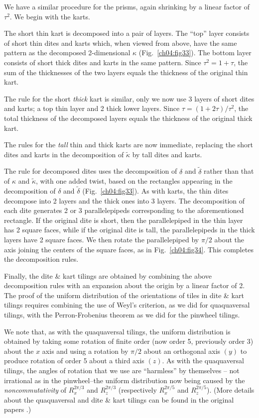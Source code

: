 \documentclass[reqno]{stml-l}
\theoremstyle{plain}
\theoremstyle{definition}
\numberwithin{equation}{chapter}
\begin{document}
We have a similar procedure for the prisms, again shrinking by a linear factor of $\tau^{2}$. We begin with the karts.

The short thin kart is decomposed into a pair of layers. The ``top'' layer consists of short thin dites and karts which, when viewed from above, have the same pattern as the decomposed 2-dimensional $\kappa$ (Fig.~\ref{ch04:fig33}). The bottom layer consists of short thick dites and karts in the same pattern. Since $\tau^{2}=1+\tau$, the sum of the thicknesses of the two layers equals the thickness of the original thin kart.

The rule for the short \emph{thick} kart is similar, only we now use 3 layers of short dites and karts; a top thin layer and 2 thick lower layers. Since $\tau=(1+2\tau)/\tau^{2}$, the total thickness of the decomposed layers equals the thickness of the original thick kart.

The rules for the \emph{tall} thin and thick karts are now immediate, replacing the short dites and karts in the decomposition of $\tilde{\kappa}$ by tall dites and karts.

The rule for decomposed dites uses the decomposition of
$\delta$ and $\tilde{\delta}$ rather than that of $\kappa$
and $\tilde{\kappa}$, with one added twist, based on the
rectangles appearing in the decomposition of $\delta$ and
$\tilde{\delta}$ (Fig.~\ref{ch04:fig33}). As with karts,
the thin dites decompose into 2 layers and the thick ones
into 3 layers. The decomposition of each dite generates 2
or 3 parallelepipeds corresponding to the aforementioned
rectangle. If the original dite is short, then the
parallelepiped in the thin layer has 2 square faces, while
if the original dite is tall, the parallelepipeds in the
thick layers have 2 square faces. We then rotate the
parallelepiped by $\pi/2$ about the axis joining the
centers of the square faces, as in Fig.~\ref{ch04:fig34}.
This completes the decomposition rules.

Finally, the dite \& kart tilings are obtained by combining the above decomposition rules with an expansion about the origin by a linear factor of 2. The proof of the uniform distribution of the orientations of tiles in dite \& kart tilings requires combining the use of Weyl's criterion, as we did for quaquaversal tilings, with the Perron-Frobenius theorem as we did for the pinwheel tilings.

We note that, as with the quaquaversal tilings, the uniform distribution is obtained by taking some rotation of finite order (now order 5, previously order 3) about the $x$ axis and using a rotation by $\pi/2$ about an orthogonal axis $(y)$ to produce rotation of order 5 about a third axis $(z)$. As with the quaquaversal tilings, the angles of rotation that we use are ``harmless'' by themselves -- not irrational as in the pinwheel--the uniform distribution now being caused by the \emph{noncommutativity} of $R_{x}^{2\pi/3}$ and $R_{z}^{2\pi/3}$ (respectively $R_{x}^{2\pi/5}$ and $R_{z}^{2\pi/5}$). (More details about the quaquaversal and dite \& kart tilings can be found in the original papers \cite{bib:CoR,bib:RS1}.)
\end{document}
